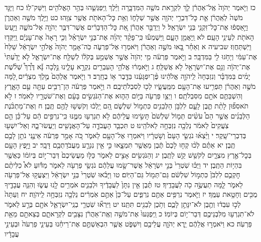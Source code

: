\documentclass[twoside, openany, parskip=half, 11pt]{book}
\begin{document}
כז וַיֹּ֤אמֶר יְהֹוָה֙ אֶֽל־אַהֲרֹ֔ן לֵ֛ךְ לִקְרַ֥את מֹשֶׁ֖ה הַמִּדְבָּ֑רָה וַיֵּ֗לֶךְ וַֽיִּפְגְּשֵׁ֛הוּ בְּהַ֥ר הָאֱלֹהִ֖ים וַיִּשַּׁק־לֽוֹ׃ כח וַיַּגֵּ֤ד מֹשֶׁה֙ לְאַֽהֲרֹ֔ן אֵ֛ת כׇּל־דִּבְרֵ֥י יְהֹוָ֖ה אֲשֶׁ֣ר שְׁלָח֑וֹ וְאֵ֥ת כׇּל־הָאֹתֹ֖ת אֲשֶׁ֥ר צִוָּֽהוּ׃ כט וַיֵּ֥לֶךְ מֹשֶׁ֖ה וְאַהֲרֹ֑ן וַיַּ֣אַסְפ֔וּ אֶת־כׇּל־זִקְנֵ֖י בְּנֵ֥י יִשְׂרָאֵֽל׃ ל וַיְדַבֵּ֣ר אַהֲרֹ֔ן אֵ֚ת כׇּל־הַדְּבָרִ֔ים אֲשֶׁר־דִּבֶּ֥ר יְהֹוָ֖ה אֶל־מֹשֶׁ֑ה וַיַּ֥עַשׂ הָאֹתֹ֖ת לְעֵינֵ֥י הָעָֽם׃ לא וַֽיַּאֲמֵ֖ן הָעָ֑ם וַֽיִּשְׁמְע֡וּ כִּֽי־פָקַ֨ד יְהֹוָ֜ה אֶת־בְּנֵ֣י יִשְׂרָאֵ֗ל וְכִ֤י רָאָה֙ אֶת־עׇנְיָ֔ם וַֽיִּקְּד֖וּ וַיִּֽשְׁתַּחֲוֽוּ׃ שביעיה א וְאַחַ֗ר בָּ֚אוּ מֹשֶׁ֣ה וְאַהֲרֹ֔ן וַיֹּאמְר֖וּ אֶל־פַּרְעֹ֑ה כֹּֽה־אָמַ֤ר יְהֹוָה֙ אֱלֹהֵ֣י יִשְׂרָאֵ֔ל שַׁלַּח֙ אֶת־עַמִּ֔י וְיָחֹ֥גּוּ לִ֖י בַּמִּדְבָּֽר׃ ב וַיֹּ֣אמֶר פַּרְעֹ֔ה מִ֤י יְהֹוָה֙ אֲשֶׁ֣ר אֶשְׁמַ֣ע בְּקֹל֔וֹ לְשַׁלַּ֖ח אֶת־יִשְׂרָאֵ֑ל לֹ֤א יָדַ֙עְתִּי֙ אֶת־יְהֹוָ֔ה וְגַ֥ם אֶת־יִשְׂרָאֵ֖ל לֹ֥א אֲשַׁלֵּֽחַ׃ ג וַיֹּ֣אמְר֔וּ אֱלֹהֵ֥י הָעִבְרִ֖ים נִקְרָ֣א עָלֵ֑ינוּ נֵ֣לְכָה נָּ֡א דֶּ֩רֶךְ֩ שְׁלֹ֨שֶׁת יָמִ֜ים בַּמִּדְבָּ֗ר וְנִזְבְּחָה֙ לַֽיהֹוָ֣ה אֱלֹהֵ֔ינוּ פֶּ֨ן־יִפְגָּעֵ֔נוּ בַּדֶּ֖בֶר א֥וֹ בֶחָֽרֶב׃ ד וַיֹּ֤אמֶר אֲלֵהֶם֙ מֶ֣לֶךְ מִצְרַ֔יִם לָ֚מָּה מֹשֶׁ֣ה וְאַהֲרֹ֔ן תַּפְרִ֥יעוּ אֶת־הָעָ֖ם מִמַּֽעֲשָׂ֑יו לְכ֖וּ לְסִבְלֹתֵיכֶֽם׃ ה וַיֹּ֣אמֶר פַּרְעֹ֔ה הֵן־רַבִּ֥ים עַתָּ֖ה עַ֣ם הָאָ֑רֶץ וְהִשְׁבַּתֶּ֥ם אֹתָ֖ם מִסִּבְלֹתָֽם׃ ו וַיְצַ֥ו פַּרְעֹ֖ה בַּיּ֣וֹם הַה֑וּא אֶת־הַנֹּגְשִׂ֣ים בָּעָ֔ם וְאֶת־שֹׁטְרָ֖יו לֵאמֹֽר׃ ז לֹ֣א תֹאסִפ֞וּן לָתֵ֨ת תֶּ֧בֶן לָעָ֛ם לִלְבֹּ֥ן הַלְּבֵנִ֖ים כִּתְמ֣וֹל שִׁלְשֹׁ֑ם הֵ֚ם יֵֽלְכ֔וּ וְקֹשְׁשׁ֥וּ לָהֶ֖ם תֶּֽבֶן׃ ח וְאֶת־מַתְכֹּ֨נֶת הַלְּבֵנִ֜ים אֲשֶׁ֣ר הֵם֩ עֹשִׂ֨ים תְּמ֤וֹל שִׁלְשֹׁם֙ תָּשִׂ֣ימוּ עֲלֵיהֶ֔ם לֹ֥א תִגְרְע֖וּ מִמֶּ֑נּוּ כִּֽי־נִרְפִּ֣ים הֵ֔ם עַל־כֵּ֗ן הֵ֤ם צֹֽעֲקִים֙ לֵאמֹ֔ר נֵלְכָ֖ה נִזְבְּחָ֥ה לֵאלֹהֵֽינוּ׃ ט תִּכְבַּ֧ד הָעֲבֹדָ֛ה עַל־הָאֲנָשִׁ֖ים וְיַעֲשׂוּ־בָ֑הּ וְאַל־יִשְׁע֖וּ בְּדִבְרֵי־שָֽׁקֶר׃ י וַיֵּ֨צְא֜וּ נֹגְשֵׂ֤י הָעָם֙ וְשֹׁ֣טְרָ֔יו וַיֹּאמְר֥וּ אֶל־הָעָ֖ם לֵאמֹ֑ר כֹּ֚ה אָמַ֣ר פַּרְעֹ֔ה אֵינֶ֛נִּי נֹתֵ֥ן לָכֶ֖ם תֶּֽבֶן׃ יא אַתֶּ֗ם לְכ֨וּ קְח֤וּ לָכֶם֙ תֶּ֔בֶן מֵאֲשֶׁ֖ר תִּמְצָ֑אוּ כִּ֣י אֵ֥ין נִגְרָ֛ע מֵעֲבֹדַתְכֶ֖ם דָּבָֽר׃ יב וַיָּ֥פֶץ הָעָ֖ם בְּכׇל־אֶ֣רֶץ מִצְרָ֑יִם לְקֹשֵׁ֥שׁ קַ֖שׁ לַתֶּֽבֶן׃ יג וְהַנֹּגְשִׂ֖ים אָצִ֣ים לֵאמֹ֑ר כַּלּ֤וּ מַעֲשֵׂיכֶם֙ דְּבַר־י֣וֹם בְּיוֹמ֔וֹ כַּאֲשֶׁ֖ר בִּהְי֥וֹת הַתֶּֽבֶן׃ יד וַיֻּכּ֗וּ שֹֽׁטְרֵי֙ בְּנֵ֣י יִשְׂרָאֵ֔ל אֲשֶׁר־שָׂ֣מוּ עֲלֵהֶ֔ם נֹגְשֵׂ֥י פַרְעֹ֖ה לֵאמֹ֑ר מַדּ֡וּעַ לֹא֩ כִלִּיתֶ֨ם חׇקְכֶ֤ם לִלְבֹּן֙ כִּתְמ֣וֹל שִׁלְשֹׁ֔ם גַּם־תְּמ֖וֹל גַּם־הַיּֽוֹם׃ טו וַיָּבֹ֗אוּ שֹֽׁטְרֵי֙ בְּנֵ֣י יִשְׂרָאֵ֔ל וַיִּצְעֲק֥וּ אֶל־פַּרְעֹ֖ה לֵאמֹ֑ר לָ֧מָּה תַעֲשֶׂ֦ה כֹ֖ה לַעֲבָדֶֽיךָ׃ טז תֶּ֗בֶן אֵ֤ין נִתָּן֙ לַעֲבָדֶ֔יךָ וּלְבֵנִ֛ים אֹמְרִ֥ים לָ֖נוּ עֲשׂ֑וּ וְהִנֵּ֧ה עֲבָדֶ֛יךָ מֻכִּ֖ים וְחָטָ֥את עַמֶּֽךָ׃ יז וַיֹּ֛אמֶר נִרְפִּ֥ים אַתֶּ֖ם נִרְפִּ֑ים עַל־כֵּן֙ אַתֶּ֣ם אֹֽמְרִ֔ים נֵלְכָ֖ה נִזְבְּחָ֥ה לַֽיהֹוָֽה׃ יח וְעַתָּה֙ לְכ֣וּ עִבְד֔וּ וְתֶ֖בֶן לֹא־יִנָּתֵ֣ן לָכֶ֑ם וְתֹ֥כֶן לְבֵנִ֖ים תִּתֵּֽנוּ׃ יט וַיִּרְא֞וּ שֹֽׁטְרֵ֧י בְנֵֽי־יִשְׂרָאֵ֛ל אֹתָ֖ם בְּרָ֣ע לֵאמֹ֑ר לֹא־תִגְרְע֥וּ מִלִּבְנֵיכֶ֖ם דְּבַר־י֥וֹם בְּיוֹמֽוֹ׃ כ וַֽיִּפְגְּעוּ֙ אֶת־מֹשֶׁ֣ה וְאֶֽת־אַהֲרֹ֔ן נִצָּבִ֖ים לִקְרָאתָ֑ם בְּצֵאתָ֖ם מֵאֵ֥ת פַּרְעֹֽה׃ כא וַיֹּאמְר֣וּ אֲלֵהֶ֔ם יֵ֧רֶא יְהֹוָ֛ה עֲלֵיכֶ֖ם וְיִשְׁפֹּ֑ט אֲשֶׁ֧ר הִבְאַשְׁתֶּ֣ם אֶת־רֵיחֵ֗נוּ בְּעֵינֵ֤י פַרְעֹה֙ וּבְעֵינֵ֣י עֲבָדָ֔יו 
\end{document}
